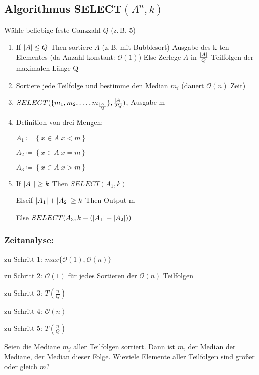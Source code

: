 \documentclass[ngerman,draft,parskip=half*,twoside]{scrreprt}
\theoremstyle{break}
\theoremstyle{nonumberbreak}
\newcommand*{\OO}{\mathcal{O}}      %
\DeclarePairedDelimiter{\abs}{\lvert}{\rvert}
\begin{document}
 \subsection{Algorithmus \texorpdfstring{SELECT$(A^{n},k)$}{SELECT (An,k)}}
 Wähle beliebige feste Ganzzahl $Q$ (z.\,B. 5)
 \begin{enumerate}[Schr{i}tt~1:]
  \item If $\abs{A}\leq Q$ Then sortiere $A$ (z.\,B. mit Bubblesort)
  \hspace{2cm}Ausgabe des k-ten Elementes \hfill(da Anzahl konstant: $\OO(1)$)
  \hspace{1cm}Else Zerlege $A$ in $\frac{\abs{A}}{Q}$ Teilfolgen der maximalen Länge Q
  \item Sortiere jede Teilfolge und bestimme den Median $m_{i}$ \hfill(dauert $\OO(n)$ Zeit)
  \item $SELECT(\{m_{1}, m_{2}, \ldots , m_{\frac{\abs{A}}{Q}}\},\frac{\abs{A}}{2Q})$, Ausgabe m
  \item Definition von drei Mengen:

  $A_{1}\coloneqq \left\{x\in A|x<m\right\}$

  $A_{2}\coloneqq \left\{x\in A|x=m\right\}$

  $A_{3}\coloneqq \left\{x\in A|x>m\right\}$
  \item If $\abs{A_{1}}\geq k$ Then $SELECT (A_{1},k)$

  \hspace{1cm}Elseif $\abs{A_{1}}+\abs{A_{2}}\geq k$ Then Output m

  \hspace{1cm}Else $SELECT (A_{3},k-(\abs{A_{1}}+\abs{A_{2}}))$
 \end{enumerate}
 
 \subsubsection{Zeitanalyse:}
 \hspace{4mm}zu Schritt 1: $max\{\OO(1),\OO(n)\}$

 zu Schritt 2: $\OO(1)$ für jedes Sortieren der $\OO(n)$ Teilfolgen

 zu Schritt 3: $T(\frac{n}{Q})$

 zu Schritt 4: $\OO(n)$

 zu Schritt 5: $T(\frac{n}{Q})$
 
 
Seien die Mediane $m_{j}$ aller Teilfolgen sortiert. Dann ist $m$, der Median der Mediane, der Median dieser Folge. 
Wieviele Elemente aller Teilfolgen sind größer oder gleich $m$?
\end{document}
